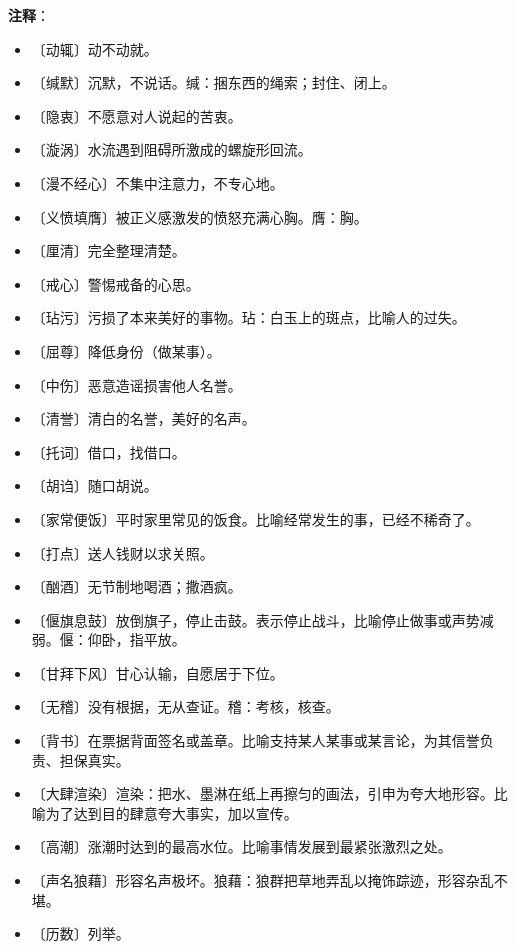 \documentclass[12pt,UTF-8,openany]{ctexbook}
\begin{document}
\newpage

\textbf{注释}：

\vspace{-1em}

\begin{itemize}
    \setlength\itemsep{-0.2em}
    \item 〔动辄〕动不动就。
    \item 〔缄默〕沉默，不说话。缄：捆东西的绳索；封住、闭上。
    \item 〔隐衷〕不愿意对人说起的苦衷。
    \item 〔漩涡〕水流遇到阻碍所激成的螺旋形回流。
    \item 〔漫不经心〕不集中注意力，不专心地。
    \item 〔义愤填膺〕被正义感激发的愤怒充满心胸。膺：胸。
    \item 〔厘清〕完全整理清楚。
    \item 〔戒心〕警惕戒备的心思。
    \item 〔玷污〕污损了本来美好的事物。玷：白玉上的斑点，比喻人的过失。
    \item 〔屈尊〕降低身份（做某事）。
    \item 〔中伤〕恶意造谣损害他人名誉。
    \item 〔清誉〕清白的名誉，美好的名声。
    \item 〔托词〕借口，找借口。
    \item 〔胡诌〕随口胡说。
    \item 〔家常便饭〕平时家里常见的饭食。比喻经常发生的事，已经不稀奇了。
    \item 〔打点〕送人钱财以求关照。
    \item 〔酗酒〕无节制地喝酒；撒酒疯。
    \item 〔偃旗息鼓〕放倒旗子，停止击鼓。表示停止战斗，比喻停止做事或声势减弱。偃：仰卧，指平放。
    \item 〔甘拜下风〕甘心认输，自愿居于下位。
    \item 〔无稽〕没有根据，无从查证。稽：考核，核查。
    \item 〔背书〕在票据背面签名或盖章。比喻支持某人某事或某言论，为其信誉负责、担保真实。
    \item 〔大肆渲染〕渲染：把水、墨淋在纸上再擦匀的画法，引申为夸大地形容。比喻为了达到目的肆意夸大事实，加以宣传。
    \item 〔高潮〕涨潮时达到的最高水位。比喻事情发展到最紧张激烈之处。
    \item 〔声名狼藉〕形容名声极坏。狼藉：狼群把草地弄乱以掩饰踪迹，形容杂乱不堪。
    \item 〔历数〕列举。
\end{itemize}
\end{document}
